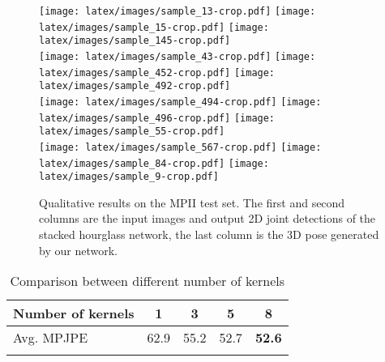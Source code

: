 \documentclass[10pt,twocolumn,letterpaper]{article}
\begin{document}
\begin{figure*}[h!]
  \centering


\quad 
\texttt{[image: latex/images/sample\_13-crop.pdf]} \hfill
  \texttt{[image: latex/images/sample\_15-crop.pdf]}\hfill
\texttt{[image: latex/images/sample\_145-crop.pdf]}\quad\\



\quad 
\texttt{[image: latex/images/sample\_43-crop.pdf]} \hfill
  \texttt{[image: latex/images/sample\_452-crop.pdf]}\hfill
\texttt{[image: latex/images/sample\_492-crop.pdf]}\quad\\

\quad 
\texttt{[image: latex/images/sample\_494-crop.pdf]} \hfill
  \texttt{[image: latex/images/sample\_496-crop.pdf]}\hfill
\texttt{[image: latex/images/sample\_55-crop.pdf]}\quad\\

\quad 
\texttt{[image: latex/images/sample\_567-crop.pdf]} \hfill
  \texttt{[image: latex/images/sample\_84-crop.pdf]}\hfill
\texttt{[image: latex/images/sample\_9-crop.pdf]}\quad\\




  \caption{Qualitative results on the MPII test set. The first and second columns are the input images and output 2D joint detections of the stacked hourglass network, the last column is the 3D pose generated by our network.
  }
  \vspace*{-4mm}
  \label{fig:viz_mpii}
\end{figure*}



\begin{table}[ht]
\caption{Comparison between different number of  kernels}
\vspace{-1mm}
\centering
\small
\setlength{\tabcolsep}{8pt}
\setlength{\textfloatsep}{2pt}
\begin{tabular*}{0.45\textwidth}{ l c c c c } 
 \hline
Number of kernels  & 1 & 3 &  5 & 8\\ 
 \hline
  Avg. MPJPE & 62.9 & 55.2 & 52.7  &  \bf 52.6  \\
  \hline
  \vspace{-7mm}
\end{tabular*}
\label{Tab:differentKernelNumber}
\end{table}
\end{document}
